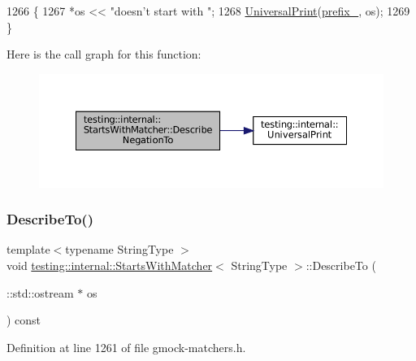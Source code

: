 \begin{DoxyCode}
1266                                                 \{
1267     *os << \textcolor{stringliteral}{"doesn't start with "};
1268     \hyperlink{namespacetesting_1_1internal_a30708fa2bacf11895b03bdb21eb72309}{UniversalPrint}(\hyperlink{classtesting_1_1internal_1_1StartsWithMatcher_a9122de4c38f40c95f822fb8d290942f9}{prefix\_}, os);
1269   \}
\end{DoxyCode}
Here is the call graph for this function\+:
\nopagebreak
\begin{figure}[H]
\begin{center}
\leavevmode
\includegraphics[width=350pt]{classtesting_1_1internal_1_1StartsWithMatcher_aae30b57dac10fec73d454b6d7543acea_cgraph}
\end{center}
\end{figure}
\mbox{\label{classtesting_1_1internal_1_1StartsWithMatcher_af52b4c04ade7f5226c7302c845d44eaf}} 
\subsubsection{\texorpdfstring{Describe\+To()}{DescribeTo()}}
{\footnotesize\ttfamily template$<$typename String\+Type $>$ \\
void \hyperlink{classtesting_1_1internal_1_1StartsWithMatcher}{testing\+::internal\+::\+Starts\+With\+Matcher}$<$ String\+Type $>$\+::Describe\+To (\begin{DoxyParamCaption}\item[{\+::std\+::ostream $\ast$}]{os }\end{DoxyParamCaption}) const\hspace{0.3cm}{\ttfamily [inline]}}



Definition at line 1261 of file gmock-\/matchers.\+h.



